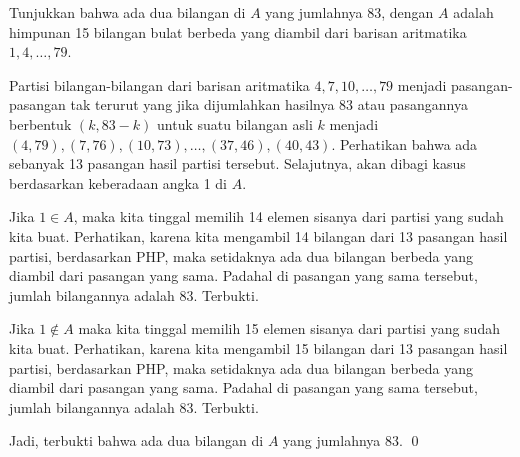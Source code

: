 \documentclass[12pt]{scrartcl}
\begin{document}
	\newpage
	\begin{soalbaru} 
		 Tunjukkan bahwa ada dua bilangan di $A$ yang jumlahnya 83, dengan $A$ adalah himpunan 15 bilangan bulat berbeda yang diambil dari barisan aritmatika $1,4,\dots,79$.\\[-10pt]
		 
		 \begin{solusi}
		 Partisi bilangan-bilangan dari barisan aritmatika $4,7,10,\dots,79$ menjadi pasangan-pasangan tak terurut yang jika dijumlahkan hasilnya 83 atau pasangannya berbentuk $(k,83-k)$ untuk suatu bilangan asli $k$ menjadi $(4,79),(7,76),(10,73),\dots,(37,46),(40,43)$. Perhatikan bahwa ada sebanyak 13 pasangan hasil partisi tersebut. Selajutnya, akan dibagi kasus berdasarkan keberadaan angka 1 di $A$. 
		 
		 Jika $1 \in A$, maka kita tinggal memilih 14 elemen sisanya dari partisi yang sudah kita buat. Perhatikan, karena kita mengambil 14 bilangan dari 13 pasangan hasil partisi, berdasarkan PHP, maka setidaknya ada dua bilangan berbeda yang diambil dari pasangan yang sama. Padahal di pasangan yang sama tersebut, jumlah bilangannya adalah 83. Terbukti.
		 
		 Jika $1 \not \in A$ maka kita tinggal memilih 15 elemen sisanya dari partisi yang sudah kita buat. Perhatikan, karena kita mengambil 15 bilangan dari 13 pasangan hasil partisi, berdasarkan PHP, maka setidaknya ada dua bilangan berbeda yang diambil dari pasangan yang sama. Padahal di pasangan yang sama tersebut, jumlah bilangannya adalah 83. Terbukti.
		 
		 Jadi, terbukti bahwa ada dua bilangan di $A$ yang jumlahnya 83. \qed
		 
		 
		 \end{solusi}
	\end{soalbaru}
	
\end{document}
